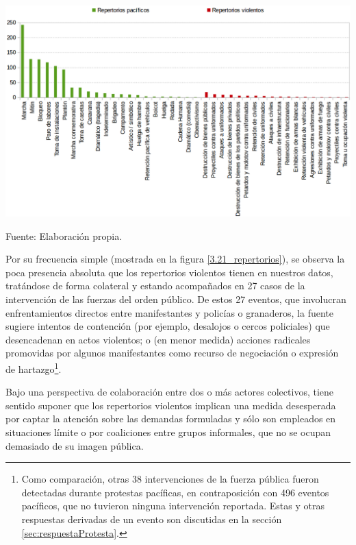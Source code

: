 \documentclass[letterpaper, 11pt]{book}
\theoremstyle{definition}
\theoremstyle{remark}
\begin{document}
\hspace{-1em}\begin{minipage}{\linewidth}
\centering
{} \label{3.21_repertorios}
\hspace{-1em}\includegraphics[scale=0.36]{img/3.21_repertorios.png}
\par
\small Fuente: Elaboración propia.
\end{minipage}\bigskip


Por su frecuencia simple (mostrada en la figura \ref{3.21_repertorios}), se observa la poca presencia absoluta que los repertorios violentos tienen en nuestros datos, tratándose de forma colateral y estando acompañados en 27 casos de la intervención de las fuerzas del orden público. 
De estos 27 eventos, que involucran enfrentamientos directos entre manifestantes y policías o granaderos, la fuente sugiere intentos de contención (por ejemplo, desalojos o cercos policiales) que desencadenan en actos violentos; o (en menor medida) acciones radicales promovidas por algunos manifestantes como recurso de negociación o expresión de hartazgo\footnote{
    Como comparación, otras 38 intervenciones de la fuerza pública fueron detectadas durante protestas pacíficas, en contraposición con 496 eventos pacíficos, que no tuvieron ninguna intervención reportada. 
    Estas y otras respuestas derivadas de un evento son discutidas en la sección \ref{sec:respuestaProtesta}. 
}. 
 

Bajo una perspectiva de colaboración entre dos o más actores colectivos, tiene sentido suponer que los repertorios violentos implican una medida desesperada por captar la atención sobre las demandas formuladas y sólo son empleados en situaciones límite o por coaliciones entre grupos informales, que no se ocupan demasiado de su imagen pública. 
\end{document}

